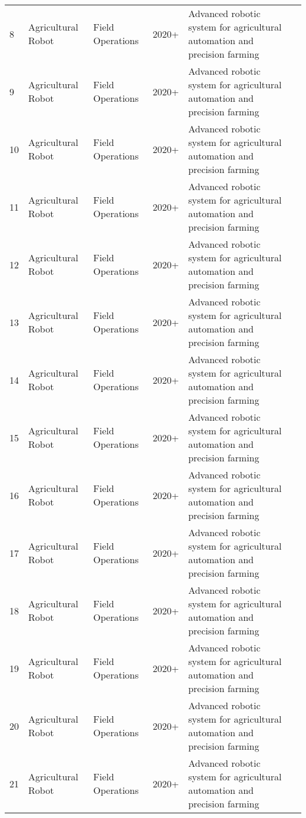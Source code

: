 \begin{table*}[htbp]
\begin{tabular}{p{}p{}p{}p{}p{}p{}}
  8 & Agricultural Robot & Field Operations & 2020+ & Advanced robotic system for agricultural automation and precision farming & \cite{williams2019robotic} \\
  9 & Agricultural Robot & Field Operations & 2020+ & Advanced robotic system for agricultural automation and precision farming & \cite{xiong2019development} \\
 10 & Agricultural Robot & Field Operations & 2020+ & Advanced robotic system for agricultural automation and precision farming & \cite{lehnert2017autonomous} \\
 11 & Agricultural Robot & Field Operations & 2020+ & Advanced robotic system for agricultural automation and precision farming & \cite{yaguchi2016development} \\
 12 & Agricultural Robot & Field Operations & 2020+ & Advanced robotic system for agricultural automation and precision farming & \cite{birrell2020field} \\
 13 & Agricultural Robot & Field Operations & 2020+ & Advanced robotic system for agricultural automation and precision farming & \cite{barth2016design} \\
 14 & Agricultural Robot & Field Operations & 2020+ & Advanced robotic system for agricultural automation and precision farming & \cite{lili2017development} \\
 15 & Agricultural Robot & Field Operations & 2020+ & Advanced robotic system for agricultural automation and precision farming & \cite{onishi2019automated} \\
 16 & Agricultural Robot & Field Operations & 2020+ & Advanced robotic system for agricultural automation and precision farming & \cite{font2014proposal} \\
 17 & Agricultural Robot & Field Operations & 2020+ & Advanced robotic system for agricultural automation and precision farming & \cite{sepulveda2020robotic} \\
 18 & Agricultural Robot & Field Operations & 2020+ & Advanced robotic system for agricultural automation and precision farming & \cite{de2018development} \\
 19 & Agricultural Robot & Field Operations & 2020+ & Advanced robotic system for agricultural automation and precision farming & \cite{hohimer2019design} \\
 20 & Agricultural Robot & Field Operations & 2020+ & Advanced robotic system for agricultural automation and precision farming & \cite{williams2020improvements} \\
 21 & Agricultural Robot & Field Operations & 2020+ & Advanced robotic system for agricultural automation and precision farming & \cite{mu2020design} \\

\end{tabular}
\end{table*}
